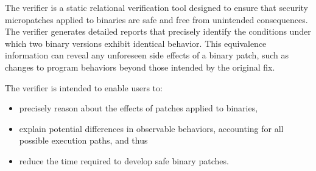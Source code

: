 The \pate{} verifier is a static relational verification tool designed to ensure that security micropatches applied to binaries are safe and free from unintended consequences.
The verifier generates detailed reports that precisely identify the conditions under which two binary versions exhibit identical behavior.
This equivalence information can reveal any unforeseen side effects of a binary patch, such as changes to program behaviors beyond those intended by the original fix.

The verifier is intended to enable users to:
\begin{itemize}
\item precisely reason about the effects of patches applied to binaries,
\item explain potential differences in observable behaviors, accounting for all possible execution paths, and thus
\item reduce the time required to develop safe binary patches.
\end{itemize}
